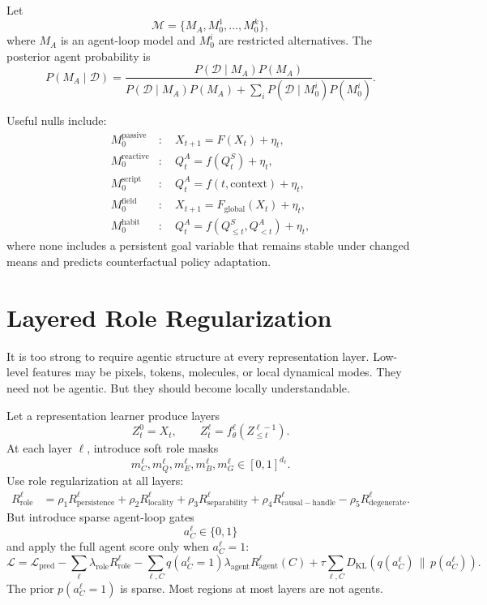\documentclass[11pt]{article}
\newcommand{\D}{\mathcal D}
\newcommand{\M}{\mathcal M}
\newcommand{\KL}{D_{\mathrm{KL}}}
\begin{document}
Let
\[
    \M = \{M_A,M_0^1,\ldots,M_0^k\},
\]
where $M_A$ is an agent-loop model and $M_0^i$ are restricted alternatives. The
posterior agent probability is
\begin{equation}
    P(M_A\mid \D)
    =
    \frac{
        P(\D\mid M_A)P(M_A)
    }{
        P(\D\mid M_A)P(M_A)
        +
        \sum_i P(\D\mid M_0^i)P(M_0^i)
    }.
    \label{eq:model-posterior}
\end{equation}

Useful nulls include:
\begin{align}
    M_0^{\mathrm{passive}}&:\quad
    X_{t+1}=F(X_t)+\eta_t,
    \\
    M_0^{\mathrm{reactive}}&:\quad
    Q^A_t=f(Q^S_t)+\eta_t,
    \\
    M_0^{\mathrm{script}}&:\quad
    Q^A_t=f(t,\text{context})+\eta_t,
    \\
    M_0^{\mathrm{field}}&:\quad
    X_{t+1}=F_{\mathrm{global}}(X_t)+\eta_t,
    \\
    M_0^{\mathrm{habit}}&:\quad
    Q^A_t=f(Q^S_{\le t},Q^A_{<t})+\eta_t,
\end{align}
where none includes a persistent goal variable that remains stable under changed
means and predicts counterfactual policy adaptation.

\section{Layered Role Regularization}

It is too strong to require agentic structure at every representation layer.
Low-level features may be pixels, tokens, molecules, or local dynamical modes.
They need not be agentic. But they should become locally understandable.

Let a representation learner produce layers
\[
    Z^0_t=X_t,\qquad
    Z^\ell_t=f^\ell_\theta(Z^{\ell-1}_{\le t}).
\]
At each layer $\ell$, introduce soft role masks
\[
    m_C^\ell,m_Q^\ell,m_E^\ell,m_B^\ell,m_G^\ell \in [0,1]^{d_\ell}.
\]
Use role regularization at all layers:
\begin{align}
    R^\ell_{\mathrm{role}}
    &=
    \rho_1 R^\ell_{\mathrm{persistence}}
    +\rho_2 R^\ell_{\mathrm{locality}}
    +\rho_3 R^\ell_{\mathrm{separability}}
    +\rho_4 R^\ell_{\mathrm{causal-handle}}
    -\rho_5 R^\ell_{\mathrm{degenerate}}.
\end{align}
But introduce sparse agent-loop gates
\[
    a^\ell_C\in\{0,1\}
\]
and apply the full agent score only when $a^\ell_C=1$:
\begin{equation}
    \mathcal L
    =
    \mathcal L_{\mathrm{pred}}
    -
    \sum_\ell \lambda_{\mathrm{role}} R^\ell_{\mathrm{role}}
    -
    \sum_{\ell,C} q(a^\ell_C=1)\lambda_{\mathrm{agent}}R^\ell_{\mathrm{agent}}(C)
    +
    \tau\sum_{\ell,C}
    \KL\!\left(q(a^\ell_C)\,\|\,p(a^\ell_C)\right).
    \label{eq:layer-objective}
\end{equation}
The prior $p(a^\ell_C=1)$ is sparse. Most regions at most layers are not agents.
\end{document}
